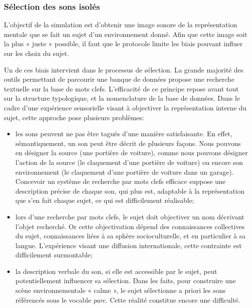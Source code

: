 \subsubsection{Sélection des sons isolés}

L'objectif de la simulation est d'obtenir une image sonore de la représentation mentale que se fait un sujet d'un environnement donné. Afin que cette image soit la plus « juste » possible, il faut que le protocole limite les biais pouvant influer sur les choix du sujet.

Un de ces biais intervient dans le processus de sélection. La grande majorité des outils permettant de parcourir une banque de données propose une recherche textuelle sur la base de mots clefs. L’efficacité de ce principe repose avant tout sur la structure typologique, et la nomenclature de la base de données. Dans le cadre d'une expérience sensorielle visant à objectiver la représentation interne du sujet, cette approche pose plusieurs problèmes:

\begin{itemize}
\item les sons peuvent ne pas être tagués d'une manière satisfaisante. En effet, sémantiquement, un son peut être décrit de plusieurs façons. Nous pouvons en désigner la source (une portière de voiture), comme nous pouvons désigner l'action de la source (le claquement d’une portière de voiture) ou encore son environnement (le claquement d’une portière de voiture dans un garage). Concevoir un système de recherche par mots clefs efficace suppose une description précise de chaque son, qui plus est, adaptable à la représentation que s’en fait chaque sujet, ce qui est difficilement réalisable;

\item lors d'une recherche par mots clefs, le sujet doit objectiver un nom décrivant l'objet recherché. Or cette objectivation dépend des connaissances collectives du sujet, connaissances liées à sa sphère socioculturelle, et en particulier à sa langue. L'expérience visant une diffusion internationale, cette contrainte est difficilement surmontable;

\item la description verbale du son, si elle est accessible par le sujet, peut potentiellement influencer sa sélection. Dans les faits, pour construire une scène environnementale « calme », le sujet sélectionne a priori les sons référencés sous le vocable \emph{parc}. Cette réalité constitue encore une difficulté.
\end{itemize}

